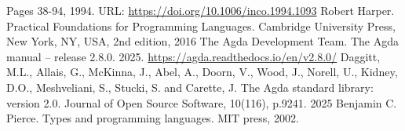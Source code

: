 Pages 38-94,
1994.
URL: \href{https://doi.org/10.1006/inco.1994.1093}{https://doi.org/10.1006/inco.1994.1093}
 Robert Harper. Practical Foundations for Programming Languages. Cambridge University
Press, New York, NY, USA, 2nd edition, 2016
 The Agda Development Team. The Agda manual – release 2.8.0. 2025.
\href{https://agda.readthedocs.io/en/v2.8.0/}{https://agda.readthedocs.io/en/v2.8.0/}
 Daggitt, M.L., Allais, G., McKinna, J., Abel, A., Doorn, V., Wood, J., Norell, U., Kidney, D.O., Meshveliani, S., Stucki, S. and Carette, J. The Agda standard library: version 2.0. Journal of Open Source Software, 10(116), p.9241. 2025
  Benjamin C. Pierce. Types and programming languages. MIT press, 2002.
